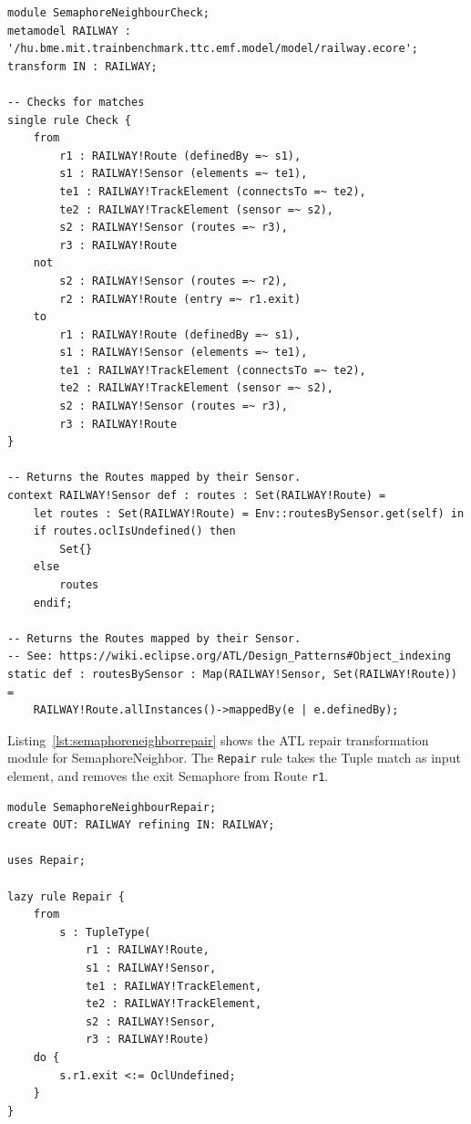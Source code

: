 \documentclass[submission,copyright,creativecommons]{eptcs}
\begin{document}
\lstset{language=simplegt}
\begin{lstlisting}[float=htb, caption={SemaphoreNeighborCheck transformation module in SimpleGT}, label=lst:semaphoreneighborcheck, captionpos=b, frame=tb, belowskip=-10pt]
module SemaphoreNeighbourCheck;
metamodel RAILWAY : '/hu.bme.mit.trainbenchmark.ttc.emf.model/model/railway.ecore';
transform IN : RAILWAY;

-- Checks for matches
single rule Check {
	from
		r1 : RAILWAY!Route (definedBy =~ s1),
		s1 : RAILWAY!Sensor (elements =~ te1),
		te1 : RAILWAY!TrackElement (connectsTo =~ te2),
		te2 : RAILWAY!TrackElement (sensor =~ s2),
		s2 : RAILWAY!Sensor (routes =~ r3),
		r3 : RAILWAY!Route
	not
		s2 : RAILWAY!Sensor (routes =~ r2),
		r2 : RAILWAY!Route (entry =~ r1.exit)
	to
		r1 : RAILWAY!Route (definedBy =~ s1),
		s1 : RAILWAY!Sensor (elements =~ te1),
		te1 : RAILWAY!TrackElement (connectsTo =~ te2),
		te2 : RAILWAY!TrackElement (sensor =~ s2),
		s2 : RAILWAY!Sensor (routes =~ r3),
		r3 : RAILWAY!Route
}

-- Returns the Routes mapped by their Sensor.
context RAILWAY!Sensor def : routes : Set(RAILWAY!Route) =
	let routes : Set(RAILWAY!Route) = Env::routesBySensor.get(self) in
	if routes.oclIsUndefined() then
		Set{}
	else
		routes
	endif;

-- Returns the Routes mapped by their Sensor.
-- See: https://wiki.eclipse.org/ATL/Design_Patterns#Object_indexing
static def : routesBySensor : Map(RAILWAY!Sensor, Set(RAILWAY!Route)) =
	RAILWAY!Route.allInstances()->mappedBy(e | e.definedBy);
\end{lstlisting}

Listing~\ref{lst:semaphoreneighborrepair} shows the ATL repair transformation module for SemaphoreNeighbor. The \texttt{Repair} rule takes the Tuple match as input element, and removes the exit Semaphore from Route \texttt{r1}.

\lstset{language=atl}
\begin{lstlisting}[float=htb, caption={SemaphoreNeighbor repair transformation module in ATL}, label=lst:semaphoreneighborrepair, captionpos=b, frame=tb, belowskip=-10pt]
module SemaphoreNeighbourRepair;
create OUT: RAILWAY refining IN: RAILWAY;

uses Repair;

lazy rule Repair {
	from
		s : TupleType(
			r1 : RAILWAY!Route,
			s1 : RAILWAY!Sensor, 
			te1 : RAILWAY!TrackElement, 
			te2 : RAILWAY!TrackElement, 
			s2 : RAILWAY!Sensor,
			r3 : RAILWAY!Route)
	do {
		s.r1.exit <:= OclUndefined;
	}
}
\end{lstlisting}
\end{document}
